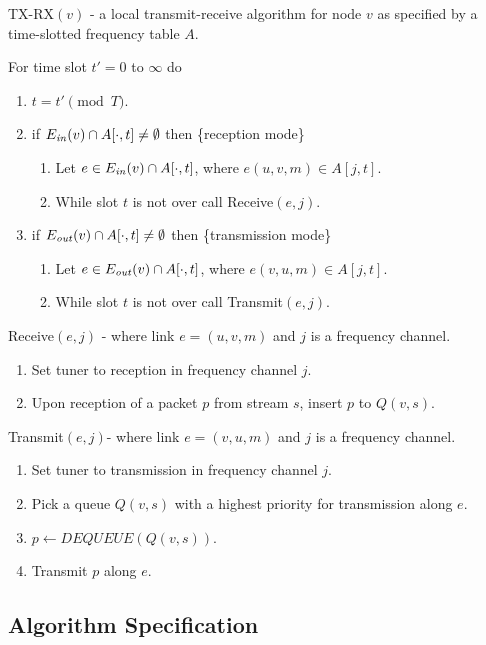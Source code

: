 \documentclass[12pt]{article}
\newenvironment{proof sketch}[1]{\noindent {\emph{Proof sketch of #1:}}}{\hfill \qed}
\newcommand{\Ein}{E_{\text{\emph{in}}}}
\newcommand{\Eout}{E_{\text{\emph{out}}}}
\begin{document}
\begin{algorithm}
  \caption{TX-RX$(v)$ - a local transmit-receive algorithm for node
    $v$ as specified by a time-slotted frequency table $A$.}
\label{alg:tx-rx}
For time slot $t'=0$ to $\infty$ do
  \begin{enumerate}%
\item $t = t' \pmod T$.
  \item if $\Ein(v)\cap A[\cdot,t ]\neq \emptyset$ then
    \{reception mode\}
    \begin{enumerate}%
    \item Let $e\in \Ein(v)\cap A[\cdot,t]$, where $e(u,v,m)\in
      A[j,t]$.
    \item While slot $t$ is not over call Receive$(e,j)$.
    \end{enumerate}%
  \item if $\Eout(v)\cap A[\cdot,t ]\neq \emptyset$ then
    \{transmission mode\}
    \begin{enumerate}%
    \item Let $e\in \Eout(v)\cap A[\cdot,t ]$, where
      $e(v,u,m)\in A[j,t]$.
    \item While slot $t$ is not over call Transmit$(e,j)$.
    \end{enumerate}%
  \end{enumerate}%
Receive$(e,j)$ - where link $e=(u,v,m)$ and $j$ is a frequency channel.
\begin{enumerate}
\item Set tuner to reception in frequency channel $j$.
\item Upon reception of a packet $p$ from stream $s$, insert $p$ to $Q(v,s)$.
\end{enumerate}

Transmit$(e,j)$-  where link $e=(v,u,m)$ and $j$ is a frequency channel.
\begin{enumerate}
\item Set tuner to transmission in frequency channel $j$.
\item\label{line:priority} Pick a queue $Q(v,s)$ with a highest priority for transmission along $e$.
\item $p \gets DEQUEUE(Q(v,s))$.
\item Transmit $p$ along $e$.
\end{enumerate}
\end{algorithm}

\subsection{Algorithm Specification}
\end{document}
